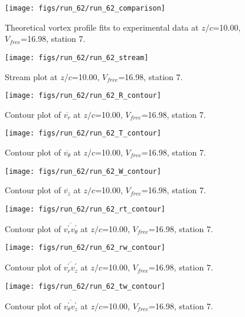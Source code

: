\begin{figure}[H]
\centering
\texttt{[image: figs/run\_62/run\_62\_comparison]}
\caption{Theoretical vortex profile fits to experimental data at $z/c$=10.00, $V_{free}$=16.98, station 7.}
\end{figure}


\begin{figure}[H]
\centering
\texttt{[image: figs/run\_62/run\_62\_stream]}
\caption{Stream plot at $z/c$=10.00, $V_{free}$=16.98, station 7.}
\end{figure}


\begin{figure}[H]
\centering
\texttt{[image: figs/run\_62/run\_62\_R\_contour]}
\caption{Contour plot of $\overline{v_{r}}$ at $z/c$=10.00, $V_{free}$=16.98, station 7.}
\end{figure}


\begin{figure}[H]
\centering
\texttt{[image: figs/run\_62/run\_62\_T\_contour]}
\caption{Contour plot of $\overline{v_{\theta}}$ at $z/c$=10.00, $V_{free}$=16.98, station 7.}
\end{figure}


\begin{figure}[H]
\centering
\texttt{[image: figs/run\_62/run\_62\_W\_contour]}
\caption{Contour plot of $\overline{v_{z}}$ at $z/c$=10.00, $V_{free}$=16.98, station 7.}
\end{figure}


\begin{figure}[H]
\centering
\texttt{[image: figs/run\_62/run\_62\_rt\_contour]}
\caption{Contour plot of $\overline{v_{r}^{\prime} v_{\theta}^{\prime}}$ at $z/c$=10.00, $V_{free}$=16.98, station 7.}
\end{figure}


\begin{figure}[H]
\centering
\texttt{[image: figs/run\_62/run\_62\_rw\_contour]}
\caption{Contour plot of $\overline{v_{r}^{\prime} v_{z}^{\prime}}$ at $z/c$=10.00, $V_{free}$=16.98, station 7.}
\end{figure}


\begin{figure}[H]
\centering
\texttt{[image: figs/run\_62/run\_62\_tw\_contour]}
\caption{Contour plot of $\overline{v_{\theta}^{\prime} v_{z}^{\prime}}$ at $z/c$=10.00, $V_{free}$=16.98, station 7.}
\end{figure}


